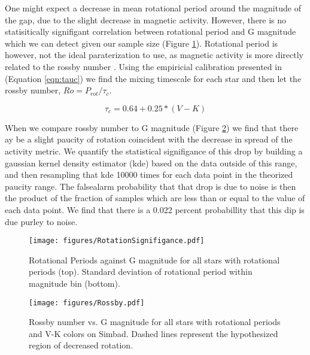 One might expect a decrease in mean rotational period around the magnitude of
the gap, due to the slight decrease in magnetic activity. However, there is no
statisitically signifigant correlation between rotational period and G
magnitude which we can detect given our sample size (Figure
\ref{fig:rotationalSignifigance}). Rotational period is however, not the ideal
paraterization to use, as magnetic activity is more directly related to the
rossby number \citep[i.e.][]{}. Using the empiricial calibration presented in
\citet{Wright2018} (Equation \ref{eqn:tauc}) we find the mixing timescale for
each star and then let the rossby number, $Ro = P_{rot}/\tau_{c}$.

\begin{equation}
  \tau_{c} = 0.64 + 0.25 * (V-K)
\end{equation}

When we compare rossby number to G magnitude (Figure \ref{fig:rossby}) we find
that there ay be a slight paucity of rotation coincident with the decrease in
spread of the activity metric. We quantify the statistical signifigance of this
drop by building a gaussian kernel density estimator (kde) based on the data
outside of this range, and then resampling that kde 10000 times for each data
point in the theorized paucity range. The falsealarm probability that that drop
is due to noise is then the product of the fraction of samples which are less
than or equal to the value of each data point. We find that there is a 0.022
percent probabillity that this dip is due purley to noise.


\begin{figure}
  \centering
  \texttt{[image: figures/RotationSignifigance.pdf]}
  \caption{Rotational Periods against G magnitude for all stars with rotational
  periods (top). Standard deviation of rotational period within magnitude bin (bottom).}
  \label{fig:rotationalSignifigance}
\end{figure}

\begin{figure}
  \centering
  \texttt{[image: figures/Rossby.pdf]}
  \caption{Rossby number vs. G magnitude for all stars with rotational periods
  and V-K colors on Simbad. Dashed lines represent the hypothesized region of decreased rotation.}
  \label{fig:rossby}
\end{figure}


